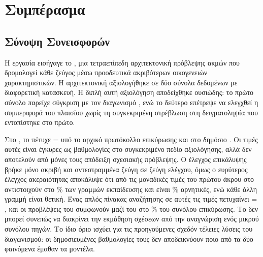 
\chapter{Συμπέρασμα}
\label{ch:conclusion}

\section{Σύνοψη Συνεισφορών}
\label{sec:summary}

Η εργασία εισήγαγε το , μια τετραεπίπεδη αρχιτεκτονική πρόβλεψης
ακμών που δρομολογεί κάθε ζεύγος μέσω προοδευτικά ακριβότερων οικογενειών
χαρακτηριστικών.
Η αρχιτεκτονική αξιολογήθηκε σε δύο σύνολα δεδομένων με
διαφορετική κατασκευή.
Η διπλή αυτή αξιολόγηση αποδείχθηκε ουσιώδης: το πρώτο
σύνολο παρείχε σύγκριση με τον διαγωνισμό , ενώ το δεύτερο επέτρεψε
να ελεγχθεί η συμπεριφορά του πλαισίου χωρίς τη συγκεκριμένη στρέβλωση στη
δειγματοληψία που εντοπίστηκε στο πρώτο.

Στο , το  πέτυχε  =
\CascadeValFone{} υπό το αρχικό πρωτόκολλο επικύρωσης και
\KaggleBaselinePublic{} στο δημόσιο .
Οι τιμές αυτές είναι
έγκυρες ως βαθμολογίες στο συγκεκριμένο πεδίο αξιολόγησης, αλλά δεν αποτελούν
από μόνες τους απόδειξη σχεσιακής πρόβλεψης.
Ο έλεγχος επικάλυψης βρήκε μόνο
\LeakageExact{} ακριβή και \LeakageReversed{} αντεστραμμένα ζεύγη σε
\TestPairs{} ζεύγη ελέγχου, όμως ο ευρύτερος έλεγχος ακεραιότητας αποκάλυψε ότι
\HubCount{} από τις
\HubUniqueSourceCount{} μοναδικές τιμές του πρώτου άκρου στο 
αντιστοιχούν στο \HubRowPct\% των γραμμών εκπαίδευσης και είναι
\HubPurityPct\% αρνητικές, ενώ κάθε άλλη γραμμή είναι θετική.
Ένας απλός
πίνακας αναζήτησης σε αυτές τις \HubCount{} τιμές πετυχαίνει  =
\HubLookupFone{}, και οι προβλέψεις του  συμφωνούν μαζί του στο
\HubValAgreementPct\% του συνόλου επικύρωσης.
Το  δεν μπορεί συνεπώς να διακρίνει την
εκμάθηση σχέσεων από την αναγνώριση ενός μικρού συνόλου πηγών.
Το ίδιο όριο
ισχύει για τις προηγούμενες σχεδόν τέλειες λύσεις του διαγωνισμού: οι
δημοσιευμένες βαθμολογίες τους δεν αποδεικνύουν ποιο από τα δύο φαινόμενα
έμαθαν τα μοντέλα.

